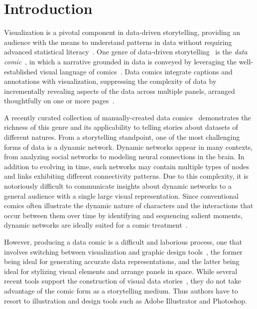 \section{Introduction}

Visualization is a pivotal component in data-driven storytelling, providing an audience with the means to understand patterns in data without requiring advanced statistical literacy~\cite{ddsbook}. One genre of data-driven storytelling~\cite{segel2010narrative} is the {\it data comic}~\cite{bach2017emerging}, in which a narrative grounded in data is conveyed by leveraging the well-established visual language of comics~\cite{mccloud1993understanding}. Data comics integrate captions and annotations with visualization, suppressing the complexity of data by incrementally revealing aspects of the data across multiple panels, arranged thoughtfully on one or more pages~\cite{bachdesign,wang2019study}. 

A recently curated collection of manually-created data comics~\cite{datacomicsnet} demonstrates the richness of this genre and its applicability to telling stories about datasets of different natures.
From a storytelling standpoint, one of the most challenging forms of data is a dynamic network. Dynamic networks appear in many contexts, from analyzing social networks to modeling neural connections in the brain. In addition to evolving in time, such networks may contain multiple types of nodes and links exhibiting different connectivity patterns. Due to this complexity, it is notoriously difficult to communicate insights about dynamic networks to a general audience with a single large visual representation. Since conventional comics often illustrate the dynamic nature of characters and the interactions that occur between them over time by identifying and sequencing salient moments, dynamic networks are ideally suited for a comic treatment~\cite{bach2016telling}. 


However, producing a data comic is a difficult and laborious process, one that involves switching between visualization and graphic design tools~\cite{bigelow2017iterating}, the former being ideal for generating accurate data representations, and the latter being ideal for stylizing visual elements and arrange panels in space. 
While several recent tools support the construction of visual data stories~\cite{kim2017data,satyanarayan2014lyra,xia2018dataink,ren2014ivisdesigner}, they do not take advantage of the comic form as a storytelling medium. Thus authors have to resort to illustration and design tools such as Adobe Illustrator and Photoshop.

